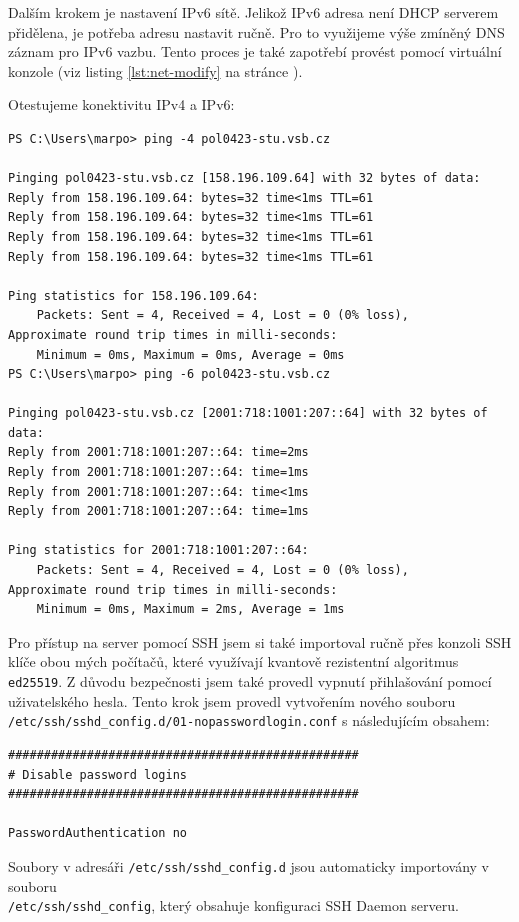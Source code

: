 Dalším krokem je nastavení IPv6 sítě. Jelikož IPv6 adresa není
DHCP serverem přidělena, je potřeba adresu nastavit ručně. Pro to
využijeme výše zmíněný DNS záznam pro IPv6 vazbu. Tento proces
je také zapotřebí provést pomocí virtuální konzole (viz listing
\ref{lst:net-modify} na stránce \pageref{lst:net-modify}).

Otestujeme konektivitu IPv4 a IPv6:

\begin{verbatim}
PS C:\Users\marpo> ping -4 pol0423-stu.vsb.cz

Pinging pol0423-stu.vsb.cz [158.196.109.64] with 32 bytes of data:
Reply from 158.196.109.64: bytes=32 time<1ms TTL=61
Reply from 158.196.109.64: bytes=32 time<1ms TTL=61
Reply from 158.196.109.64: bytes=32 time<1ms TTL=61
Reply from 158.196.109.64: bytes=32 time<1ms TTL=61

Ping statistics for 158.196.109.64:
    Packets: Sent = 4, Received = 4, Lost = 0 (0% loss),
Approximate round trip times in milli-seconds:
    Minimum = 0ms, Maximum = 0ms, Average = 0ms
PS C:\Users\marpo> ping -6 pol0423-stu.vsb.cz

Pinging pol0423-stu.vsb.cz [2001:718:1001:207::64] with 32 bytes of data:
Reply from 2001:718:1001:207::64: time=2ms
Reply from 2001:718:1001:207::64: time=1ms
Reply from 2001:718:1001:207::64: time<1ms
Reply from 2001:718:1001:207::64: time=1ms

Ping statistics for 2001:718:1001:207::64:
    Packets: Sent = 4, Received = 4, Lost = 0 (0% loss),
Approximate round trip times in milli-seconds:
    Minimum = 0ms, Maximum = 2ms, Average = 1ms
\end{verbatim}

Pro přístup na server pomocí SSH jsem si také importoval ručně
přes konzoli SSH klíče obou mých počítačů, které využívají kvantově
rezistentní algoritmus \texttt{ed25519}. Z důvodu bezpečnosti jsem
také provedl vypnutí přihlašování pomocí uživatelského hesla.
Tento krok jsem provedl vytvořením nového souboru
\texttt{/etc/ssh/sshd\_config.d/01-nopasswordlogin.conf}
s následujícím obsahem:

\newpage

\begin{verbatim}
#################################################
# Disable password logins
#################################################

PasswordAuthentication no
\end{verbatim}

Soubory v adresáři \texttt{/etc/ssh/sshd\_config.d} jsou automaticky
importovány v souboru\\
\texttt{/etc/ssh/sshd\_config}, který obsahuje konfiguraci SSH Daemon
serveru.

